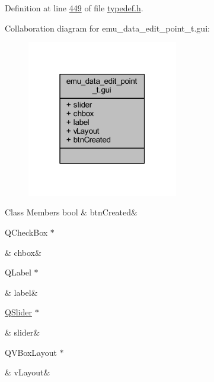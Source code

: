 Definition at line \hyperlink{a00001_source_l00449}{449} of file \hyperlink{a00001_source}{typedef.\+h}.



Collaboration diagram for emu\+\_\+data\+\_\+edit\+\_\+point\+\_\+t.\+gui\+:
\nopagebreak
\begin{figure}[H]
\begin{center}
\leavevmode
\includegraphics[width=187pt]{d9/d2a/a00270}
\end{center}
\end{figure}
\begin{DoxyFields}{Class Members}
\hypertarget{a00001_a2b308f151b5b29fe095c916d345dac14}{bool}\label{a00001_a2b308f151b5b29fe095c916d345dac14}
&
btn\+Created&
\\
\hline

\hypertarget{a00001_adc6f3955ab8e14beb85ec09ddc68ae14}{Q\+Check\+Box $\ast$}\label{a00001_adc6f3955ab8e14beb85ec09ddc68ae14}
&
chbox&
\\
\hline

\hypertarget{a00001_ad304ba20e96d87411588eeabac850e34}{Q\+Label $\ast$}\label{a00001_ad304ba20e96d87411588eeabac850e34}
&
label&
\\
\hline

\hypertarget{a00001_a10bf08f0bbd6689475be65b4ae441bd9}{\hyperlink{a00012}{Q\+Slider} $\ast$}\label{a00001_a10bf08f0bbd6689475be65b4ae441bd9}
&
slider&
\\
\hline

\hypertarget{a00001_a6d0dd75468b35b5e8ac82f808249c488}{Q\+V\+Box\+Layout $\ast$}\label{a00001_a6d0dd75468b35b5e8ac82f808249c488}
&
v\+Layout&
\\
\hline

\end{DoxyFields}
\label{de/d36/a00123}
\hypertarget{a00001_de/d36/a00123}{}
